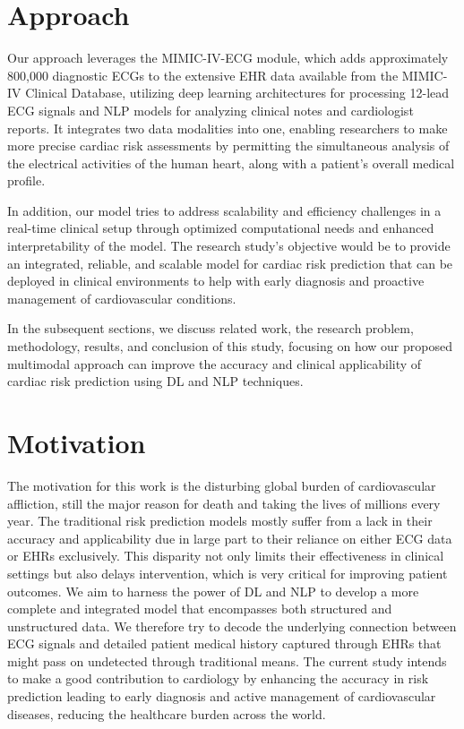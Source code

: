 \section{Approach }
Our approach leverages the MIMIC-IV-ECG module, which adds approximately 800,000 diagnostic ECGs to the extensive EHR data available from the MIMIC-IV Clinical Database, utilizing deep learning architectures for processing 12-lead ECG signals and NLP models for analyzing clinical notes and cardiologist reports. It integrates two data modalities into one, enabling researchers to make more precise cardiac risk assessments by permitting the simultaneous analysis of the electrical activities of the human heart, along with a patient's overall medical profile.

\vspace{0.5cm}
In addition, our model tries to address scalability and efficiency challenges in a real-time clinical setup through optimized computational needs and enhanced interpretability of the model. The research study's objective would be to provide an integrated, reliable, and scalable model for cardiac risk prediction that can be deployed in clinical environments to help with early diagnosis and proactive management of cardiovascular conditions.

\vspace{0.5cm}
In the subsequent sections, we discuss related work, the research problem, methodology, results, and conclusion of this study, focusing on how our proposed multimodal approach can improve the accuracy and clinical applicability of cardiac risk prediction using DL and NLP techniques.
\vspace{1.0cm}

\section{Motivation }
The motivation for this work is the disturbing global burden of cardiovascular affliction, still the major reason for death and taking the lives of millions every year. The traditional risk prediction models mostly suffer from a lack in their accuracy and applicability due in large part to their reliance on either ECG data or EHRs exclusively. This disparity not only limits their effectiveness in clinical settings but also delays intervention, which is very critical for improving patient outcomes. We aim to harness the power of  DL and NLP to develop a more complete and integrated model that encompasses both structured and unstructured data. We therefore try to decode the underlying connection between ECG signals and detailed patient medical history captured through EHRs that might pass on undetected through traditional means. The current study intends to make a good contribution to cardiology by enhancing the accuracy in risk prediction leading to early diagnosis and active management of cardiovascular diseases, reducing the healthcare burden across the world.




